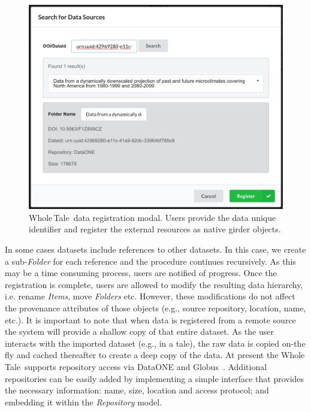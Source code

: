 \documentclass{elsarticle}
\newcommand{\wt}{Whole\,Tale}
\begin{document}
\begin{figure}[ht!]
\centering
  \includegraphics[trim=0in 0in 0in 0in,clip,width=0.75\columnwidth]{register_modal.png}
  \caption{\wt\ data registration modal. Users provide the data unique
  identifier and register the external resources as native girder objects.
  \label{fig:reg_modal}}
\end{figure}

In some cases datasets include references to other datasets. In this case, 
we create a sub-\emph{Folder} for each reference and the procedure continues
recursively. As this may be a time consuming process, users are notified of 
progress. Once the
registration is complete, users are allowed to modify the resulting data
hierarchy, i.e. rename \emph{Items}, move \emph{Folders} etc. However, these
modifications do not affect the provenance attributes of those objects (e.g., 
source repository, location, name, etc.).
It is important to note that when data is registered from a remote source
the system will provide a shallow copy of that entire 
dataset. As the user interacts with the imported dataset (e.g., in a tale),
the raw data is copied on-the fly and 
cached thereafter to create a deep copy of the data. 
At present the \wt\ supports repository access via DataONE and Globus~\cite{chard14efficient}. Additional repositories can be easily added by implementing
a simple interface that provides
the necessary information: name, size, location and access protocol;
and embedding it within the \emph{Repository} model.
\end{document}
